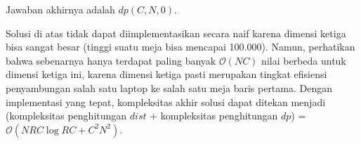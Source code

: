 \documentclass[../main_editorial.tex]{subfiles} %
\newcommand{\bigO}[1]{\mathcal{O}(#1)}
\begin{document}
Jawaban akhirnya adalah $dp(C, N, 0)$.

Solusi di atas tidak dapat diimplementasikan secara naif karena dimensi ketiga bisa sangat besar (tinggi suatu meja bisa mencapai 100.000). Namun, perhatikan bahwa sebenarnya hanya terdapat paling banyak $\bigO{NC}$ nilai berbeda untuk dimensi ketiga ini, karena dimensi ketiga pasti merupakan tingkat efisiensi penyambungan salah satu laptop ke salah satu meja baris pertama. Dengan implementasi yang tepat, kompleksitas akhir solusi dapat ditekan menjadi (kompleksitas penghitungan $dist$ + kompleksitas penghitungan $dp$) = $\bigO{NRC \log RC + C^{2} N^{2}}$.
\end{document}
